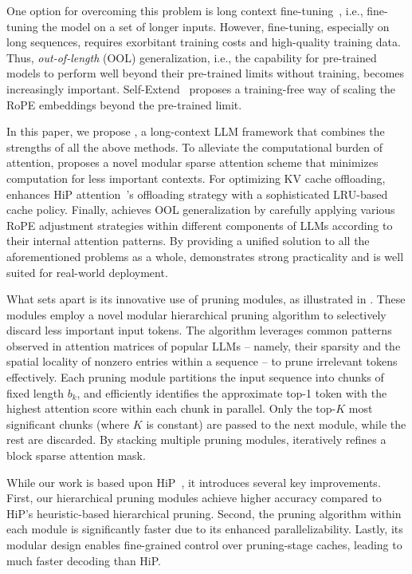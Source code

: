 One option for overcoming this problem is long context fine-tuning~\citep{roziere_code_2024}, i.e., fine-tuning the model on a set of longer inputs. However, fine-tuning, especially on long sequences, requires exorbitant training costs and high-quality training data. Thus, \textit{out-of-length} (OOL) generalization, i.e., the capability for pre-trained models to perform well beyond their pre-trained limits without training, becomes increasingly important. Self-Extend~\citep{jin_llm_2024} proposes a training-free way of scaling the RoPE embeddings beyond the pre-trained limit.

In this paper, we propose \ours, a long-context LLM framework that combines the strengths of all the above methods. To alleviate the computational burden of attention, \ours proposes a novel modular sparse attention scheme that minimizes computation for less important contexts. For optimizing KV cache offloading, \ours enhances HiP attention~\citep{lee_training-free_2024}'s offloading strategy with a sophisticated LRU-based cache policy. Finally, \ours achieves OOL generalization by carefully applying various RoPE adjustment strategies within different components of LLMs according to their internal attention patterns. By providing a unified solution to all the aforementioned problems as a whole, \ours demonstrates strong practicality and is well suited for real-world deployment.

What sets \ours apart is its innovative use of pruning modules, as illustrated in . These modules employ a novel modular hierarchical pruning algorithm to selectively discard less important input tokens. The algorithm leverages common patterns observed in attention matrices of popular LLMs -- namely, their sparsity and the spatial locality of nonzero entries within a sequence -- to prune irrelevant tokens effectively. Each pruning module partitions the input sequence into chunks of fixed length $b_k$, and efficiently identifies the approximate top-1 token with the highest attention score within each chunk in parallel. Only the top-$K$ most significant chunks (where $K$ is constant) are passed to the next module, while the rest are discarded. By stacking multiple pruning modules, \ours iteratively refines a block sparse attention mask. 

While our work is based upon HiP~\citep{lee_training-free_2024}, it introduces several key improvements. First, our hierarchical pruning modules achieve higher accuracy compared to HiP's heuristic-based hierarchical pruning. Second, the pruning algorithm within each module is significantly faster due to its enhanced parallelizability. Lastly, its modular design enables fine-grained control over pruning-stage caches, leading to much faster decoding than HiP. 

